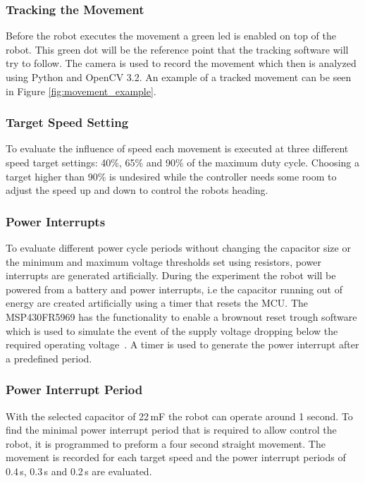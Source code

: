 \subsubsection{Tracking the Movement}

Before the robot executes the movement a green led is enabled on top of the robot.
This green dot will be the reference point that the tracking software will try to follow.
The camera is used to record the movement which then is analyzed using Python and OpenCV 3.2.
An example of a tracked movement can be seen in Figure \ref{fig:movement_example}.

\subsubsection{Target Speed Setting}
To evaluate the influence of speed each movement is executed at three different speed target settings: 40\%, 65\% and 90\% of the maximum duty cycle.
Choosing a target higher than 90\% is undesired while the controller needs some room to adjust the speed up and down to control the robots heading.

\subsubsection{Power Interrupts}

To evaluate different power cycle periods without changing the capacitor size or the minimum and maximum voltage thresholds set using resistors, power interrupts are generated artificially.
During the experiment the robot will be powered from a battery and power interrupts, i.e the capacitor running out of energy are created artificially using a timer that resets the MCU.
The MSP430FR5969 has the functionality to enable a brownout reset trough software which is used to simulate the event of the supply voltage dropping below the required operating voltage~\cite{msp430fr_family_guide_2017}.
A timer is used to generate the power interrupt after a predefined period.

\subsubsection{Power Interrupt Period}

With the selected capacitor of 22\,mF the robot can operate around 1 second. 
To find the minimal power interrupt period that is required to allow control the robot, it is programmed to preform a four second straight movement.
The movement is recorded for each target speed and the power interrupt periods of 0.4\,s, 0.3\,s and 0.2\,s are evaluated.

